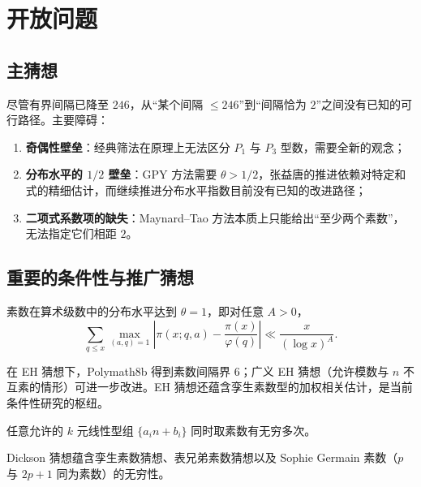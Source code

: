 \section{开放问题}\label{sec:open_problems}

\subsection{主猜想}

尽管有界间隔已降至 $246$，从“某个间隔 $\le 246$”到“间隔恰为 $2$”之间没有已知的可行路径。主要障碍：

\begin{enumerate}[label=(\arabic*)]
    \item \textbf{奇偶性壁垒}：经典筛法在原理上无法区分 $P_1$ 与 $P_3$ 型数，需要全新的观念；
    \item \textbf{分布水平的 $1/2$ 壁垒}：GPY 方法需要 $\theta > 1/2$，张益唐的推进依赖对特定和式的精细估计，而继续推进分布水平指数目前没有已知的改进路径；
    \item \textbf{二项式系数项的缺失}：Maynard--Tao 方法本质上只能给出“至少两个素数”，无法指定它们相距 $2$。
\end{enumerate}

\subsection{重要的条件性与推广猜想}

\begin{conjecture}
    素数在算术级数中的分布水平达到 $\theta = 1$，即对任意 $A > 0$，
    \begin{equation}
        \sum_{q \le x} \max_{(a,q)=1} \left|\pi(x; q, a) - \frac{\pi(x)}{\varphi(q)}\right| \ll \frac{x}{(\log x)^A}.
    \end{equation}
\end{conjecture}

在 EH 猜想下，Polymath8b 得到素数间隔界 $6$\cite{polymath2014variants}；广义 EH 猜想（允许模数与 $n$ 不互素的情形）可进一步改进。EH 猜想还蕴含孪生素数型的加权相关估计，是当前条件性研究的枢纽。

\begin{conjecture}[Dickson 猜想]
    任意允许的 $k$ 元线性型组 $\{a_i n + b_i\}$ 同时取素数有无穷多次。
\end{conjecture}

Dickson 猜想蕴含孪生素数猜想、表兄弟素数猜想以及 Sophie Germain 素数（$p$ 与 $2p+1$ 同为素数）的无穷性。

